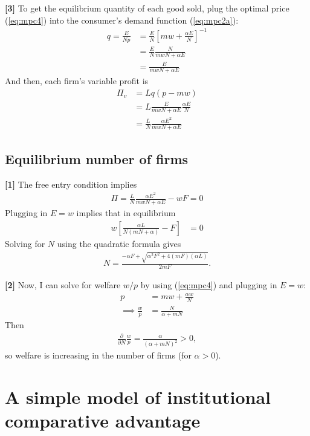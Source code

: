 \documentclass[12pt]{article}
\begin{document}
\textbf{[3]} To get the equilibrium quantity of each good sold, plug the optimal price (\ref{eq:mpc4}) into the consumer's demand function (\ref{eq:mpc2a}):
\begin{align*}
q = \frac{E}{Np} &= \frac{E}{N}\left[  mw + \frac{\alpha E}{N}\right]^{-1}\\
&=\frac{E}{N} \frac{N}{mwN + \alpha E}\\
&= \frac{E}{mwN + \alpha E}
\end{align*}
And then, each firm's variable profit is
\begin{align}
\Pi_v &= Lq(p-mw) \nonumber\\
&= L\frac{E}{mwN + \alpha E}  \frac{\alpha E}{N} \nonumber\\
&=\frac{L}{N} \frac{\alpha E^2}{ mwN + \alpha E} \label{eq:mpc5}
\end{align}

\subsection{Equilibrium number of firms}
\textbf{[1]} The free entry condition implies
\begin{align*}
\Pi = \frac{L}{N} \frac{\alpha E^2}{ mwN + \alpha E}  - wF = 0
\end{align*}
Plugging in $E=w$ implies that in equilibrium 
\begin{align*}
w \left[ \frac{\alpha L}{N(mN+ \alpha)} - F\right] &= 0
\end{align*}
Solving for $N$ using the quadratic formula gives
\begin{align*}
N = \frac{-\alpha F + \sqrt{\alpha^2F^2 + 4(mF)(\alpha L)}}{2mF}.
\end{align*}

\textbf{[2]} Now, I can solve for welfare $w/p$ by using (\ref{eq:mpc4}) and plugging in $E=w$:
\begin{align*}
p &= mw + \frac{\alpha w}{N}\\
\implies \frac{w}{p} &=\frac{N}{\alpha + mN}
\end{align*}
Then
\begin{align*}
\frac{\partial}{\partial N} \frac{w}{p}  = \frac{\alpha}{(\alpha + mN)^2} >0 ,
\end{align*}
so welfare is increasing in the number of firms (for $\alpha > 0 $).

\newpage

\section{A simple model of institutional comparative advantage}
\end{document}
